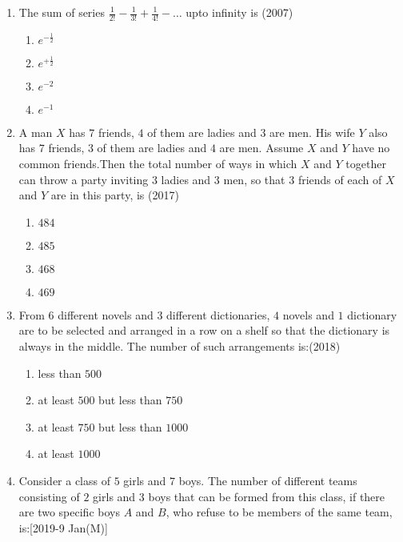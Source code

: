 \begin{enumerate}[label=\thesubsection.\arabic*,ref=\thesubsection.\theenumi]
    \item The sum of series $\frac{1}{2!}-\frac{1}{3!}+\frac{1}{4!}-\dots$ upto infinity is 
    \hfill(2007)
%
    \begin{enumerate}
    \item$e^{-\frac{1}{2}}$
    \item$e^{+\frac{1}{2}}$
    \item$e^{-2}$
    \item$e^{-1}$
    \end{enumerate}
%
	 \item A man $X$ has $7$ friends,  $4$ of them are ladies and $3$ are men. His wife $Y$ also has $7$ friends,  $3$ of them are ladies and $4$ are men. Assume $X$ and $Y$ have no common friends.Then the total number of ways in which $X$ and $Y$ together can throw a party inviting $3$ ladies and $3$ men,  so that $3$ friends of each of $X$ and $Y$ are in this party,  is \hfill{(2017)}
\begin{multicols}{4}
\begin{enumerate}    
\item $484$ 
\item $485$
\item $468$
\item $469$
\end{enumerate}
\end{multicols}
%
	\item From $6$ different novels and $3$ different dictionaries, $4$ novels and $1$ dictionary are to be selected and arranged in a row on a shelf so that  the dictionary is always in the middle. The number of such arrangements is:\hfill{(2018)}
 \begin{multicols}{4}
\begin{enumerate}    
     \item less than $500$ 
     \item at least $500$ but less than $750$
     \item at least $750$ but less than $1000$
     \item at least $1000$
     \end{enumerate}
\end{multicols}
%
	\item Consider a class of $5$ girls and $7$ boys. The number of different teams consisting of $2$ girls and $3$ boys that can be formed from this class, if there are two specific boys $A$ and $B$, who refuse to be members of the same team, is:\hfill{[2019-9 Jan(M)]}

\end{enumerate}
